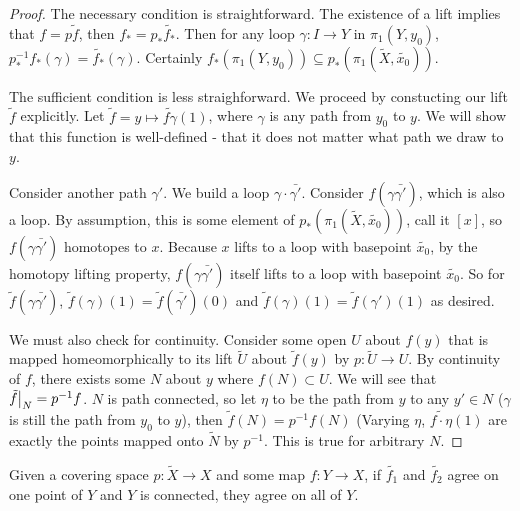 \documentclass[10pt]{article}
\newcommand\restr[2]{{%
  \left.\kern-\nulldelimiterspace %
  #1 %
  \vphantom{\big|} %
  \right|_{#2} %
}}
\begin{document}
\begin{proof}
	The necessary condition is straightforward. The existence of a lift implies
	that $f = p\tilde{f}$, then $f_* = p_*\tilde{f_*}$. Then for any loop $\gamma: I
	\to Y$ in $\pi_1(Y, y_0)$, $p_*^{-1}f_*(\gamma) = \tilde{f_*}(\gamma)$.
	Certainly $f_*(\pi_1(Y, y_0)) \subseteq p_*(\pi_1(\tilde{X}, \tilde{x_0}))$.

	The sufficient condition is less straighforward. We proceed by constucting
	our lift $\tilde{f}$ explicitly. Let $\tilde{f} = y \mapsto \tilde{f\gamma}(1)$,
	where $\gamma$ is any path from $y_0$ to $y$. We will show that this function
	is well-defined - that it does not matter what path we draw to $y$. 

	Consider another path $\gamma'$. We build a loop $\gamma \cdot
	\bar{\gamma'}$.  Consider $f(\gamma \bar{\gamma'})$, which is also a loop. By
	assumption, this is some element of $p_*(\pi_1(\tilde{X}, \tilde{x_0}))$,
	call it $[ x ]$, so $f(\gamma \bar{\gamma'})$ homotopes to $x$. Because $x$
	lifts to a loop with basepoint $\tilde{x_0}$, by the homotopy lifting
	property, $f(\gamma \bar{\gamma'})$ itself lifts to a loop with basepoint
	$\tilde{x_0}$. So for $\tilde{f}(\gamma \bar{\gamma'})$,
	$\tilde{f}(\gamma)(1) = \tilde{f}(\bar{\gamma'})(0)$ and
	$\tilde{f}(\gamma)(1) = \tilde{f}(\gamma')(1)$ as desired.

	We must also check for continuity. Consider some open $U$ about $f(y)$ that
	is mapped homeomorphically to its lift $\tilde{U}$ about $\tilde{f}(y)$ by
	$p: \tilde{U} \to U$. By continuity of $f$, there exists some $N$ about $y$
	where $f(N) \subset U$. We will see that $\restr{\tilde{f}}{N} = p^{-1}f$.
	$N$ is path connected, so let $\eta$ to be the path from $y$ to any $y' \in
	N$ ($\gamma$ is still the path from $y_0$ to $y$), then $\tilde{f}(N) =
	p^{-1}f(N)$ (Varying $\eta$, $\tilde{f\cdot\eta}(1)$ are exactly the points
	mapped onto $\tilde{N}$ by $p^{-1}$. This is true for arbitrary $N$.
\end{proof}

\begin{proposition}
	Given a covering space $p: \tilde{X} \to X$ and some map $f: Y \to X$, if
	$\tilde{f_1}$ and $\tilde{f_2}$ agree on one point of $Y$ and $Y$ is
	connected, they agree on all of $Y$.
\end{proposition}
\end{document}
